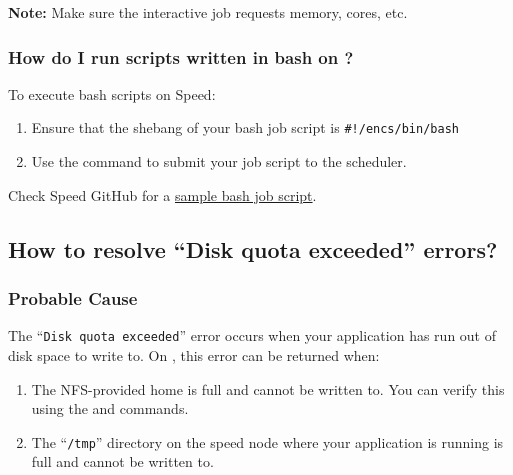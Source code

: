 \noindent\textbf{Note:} Make sure the interactive job requests memory, cores, etc.

\subsubsection{How do I run scripts written in bash on ?}

To execute bash scripts on Speed:
\begin{enumerate}
	\item Ensure that the shebang of your bash job script is \verb+#!/encs/bin/bash+
	\item Use the  command to submit your job script to the scheduler.
\end{enumerate}

\noindent Check Speed GitHub for a 
\href{https://github.com/NAG-DevOps/speed-hpc/blob/master/src/bash.sh}{sample bash job script}.

\subsection{How to resolve ``Disk quota exceeded'' errors?}
\label{sect:quota-exceeded}

\subsubsection{Probable Cause}

The ``\texttt{Disk quota exceeded}'' error occurs when your application has 
run out of disk space to write to. On , this error can be returned when:
\begin{enumerate}
	\item The NFS-provided home is full and cannot be written to.
	You can verify this using the  and  commands.
	\item The ``\texttt{/tmp}'' directory on the speed node where your application is running is full and cannot be written to.
\end{enumerate}

